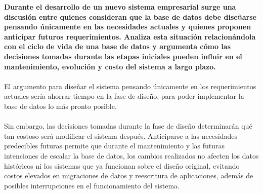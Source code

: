 \textbf{Durante el desarrollo de un nuevo sistema empresarial surge una discusión entre quienes consideran que la base de datos debe diseñarse pensando únicamente en las necesidades actuales y quienes proponen anticipar futuros requerimientos. Analiza esta situación relacionándola con el ciclo de vida de una base de datos y argumenta cómo las decisiones tomadas durante las etapas iniciales pueden influir en el mantenimiento, evolución y costo del sistema a largo plazo.}\\ \\
El argumento para diseñar el sistema pensando únicamente en los requerimientos actuales sería ahorrar tiempo en la fase de diseño, para poder implementar la base de datos lo más pronto posible.\\ \\
Sin embargo, las decisiones tomadas durante la fase de diseño determinarán qué tan costoso será modificar el sistema después. Anticiparse a las necesidades predecibles futuras permite que durante el mantenimiento y las futuras intenciones de escalar la base de datos, los cambios realizados no afecten los datos históricos ni los sistemas que ya funcionan sobre el diseño original, evitando costos elevados en migraciones de datos y reescritura de aplicaciones, además de posibles interrupciones en el funcionamiento del sistema.